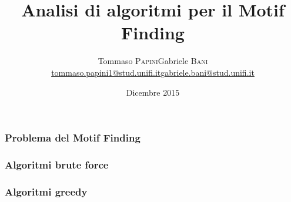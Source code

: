 



\title[Motif Finding]{Analisi di algoritmi per il Motif Finding}
\date[11 Dicembre 2015]{ Dicembre 2015}

\author[Papini - Bani]{
  \begin{center}
    \begin{tabular}{lr}
      Tommaso \textsc{Papini}&Gabriele \textsc{Bani}\\
      \href{mailto:tommaso.papini1@stud.unifi.it}{tommaso.papini1@stud.unifi.it}&
      \href{mailto:gabriele.bani@stud.unifi.it}{gabriele.bani@stud.unifi.it}
    \end{tabular}
  \end{center}
}


\begin{frame}[plain]
  \titlepage
\end{frame}

\begin{frame}
  \frametitle{Problema del Motif Finding}
\end{frame}

\begin{frame}
  \frametitle{Algoritmi brute force}
\end{frame}

\begin{frame}
  \frametitle{Algoritmi greedy}
\end{frame}

